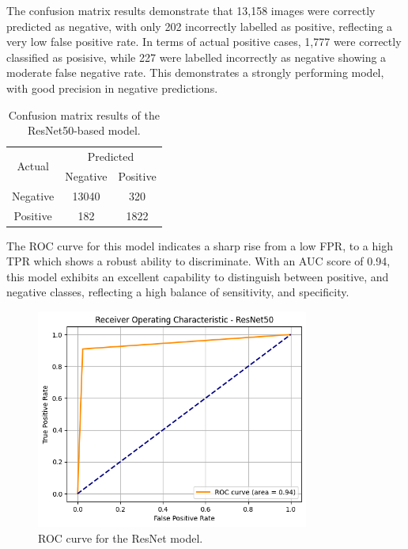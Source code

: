 \documentclass[../main]{subfiles}
\begin{document}
The confusion matrix results demonstrate that 13,158 images were correctly predicted as negative, with only 202 incorrectly labelled as positive, reflecting a very low false positive rate. In terms of actual positive cases, 1,777 were correctly classified as posisive, while 227 were labelled incorrectly as negative showing a moderate false negative rate. This demonstrates a strongly performing model, with good precision in negative predictions.

\begin{table}[h]
    \centering
    \begin{tabular}{|c|c|c|}
        \hline
        \multirow{2}{*}{Actual} & \multicolumn{2}{c|}{Predicted} \\ \cline{2-3}
                                & Negative         & Positive         \\ \hline
        Negative                & 13040            & 320              \\ \hline
        Positive                & 182              & 1822              \\ \hline
    \end{tabular}
    \caption{Confusion matrix results of the ResNet50-based model.}
    \label{tab:confusion-matrix-resnet}
\end{table}

The ROC curve for this model indicates a sharp rise from a low FPR, to a high TPR which shows a robust ability to discriminate. With an AUC score of 0.94, this model exhibits an excellent capability to distinguish between positive, and negative classes, reflecting a high balance of sensitivity, and specificity.

\begin{figure}[h]
	\centering
	\includegraphics[width=0.8\textwidth]{assets/roc_resnet.png}
	\caption{ROC curve for the ResNet model.}
    \label{fig:roc-resnet}
\end{figure}
\end{document}
